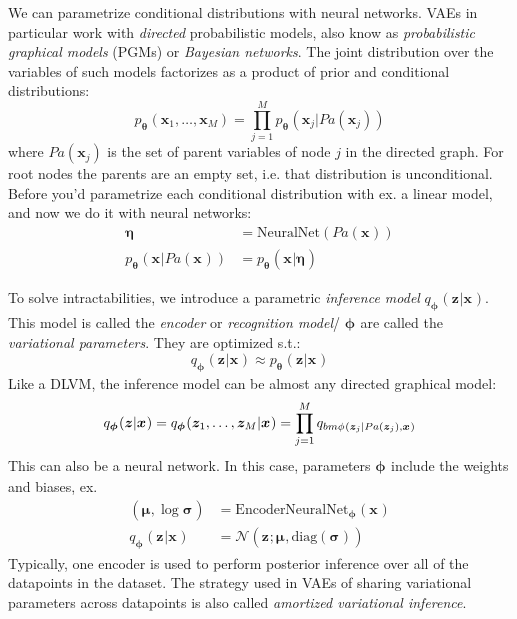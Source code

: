 We can parametrize conditional distributions with neural networks.
VAEs in particular work with \textit{directed} probabilistic models,
also know as \textit{probabilistic graphical models} (PGMs)
or \textit{Bayesian networks}.
The joint distribution over the variables of such models
factorizes as a product of prior and conditional distributions:
\begin{equation}
p_{ \bm{\theta}_{} } (\bm{x}_{1}, \dots, \bm{x}_{M}) =
\prod_{j=1}^{M} p_{ \bm{\theta}_{} } (\bm{x}_{j}| Pa (\bm{x}_{j})) 
\end{equation}
where $ P a (\bm{x}_{j})  $ is the set of parent variables of node $ j  $ in
the directed graph. For root nodes the parents are an empty set,
i.e. that distribution is unconditional.
Before you'd parametrize each conditional distribution with
ex. a linear model, and now we do it with neural networks:
\begin{align}
		\bm{\eta}_{} &= \text{NeuralNet} (P a (\bm{x}_{}))\\
		p_{ \bm{\theta}_{} } (\bm{x}_{}|Pa (\bm{x}_{})) &= p_{ \bm{\theta}_{} } (\bm{x}_{}|\bm{\eta}_{})
\end{align}

To solve intractabilities, we introduce
a parametric \textit{inference model} $ q_{ \bm{\phi}_{}} (\bm{z}_{}|\bm{x}_{})  $.
This model is called the \textit{encoder} or \textit{recognition model}/
$ \bm{\phi}_{}  $ are called the \textit{variational parameters}.
They are optimized s.t.:
\begin{equation}
		 q_{ \bm{\phi}_{}} (\bm{z}_{}|\bm{x}_{})  \approx
p_{ \bm{\theta}_{} } (\bm{z}_{}|\bm{x}_{})
\end{equation}
Like a DLVM, the inference model can be almost any directed graphical model:
\begin{equation}
		q_{ \bm{\phi}_{}} (\bm{z}_{}|\bm{x}_{}) = 
		q_{ \bm{\phi}_{}} (\bm{z}_{1}, \dots, \bm{z}_{M}|\bm{x}_{}) =
		\prod_{j=1}^{M} q_{ \\bm{\phi}_{} (\bm{z}_{j}| P a (\bm{z}_{j}), \bm{x}_{}) } 
\end{equation}
This can also be a neural network.
In this case, parameters $ \bm{\phi}_{}  $ include the weights and biases, ex.
\begin{align}
		(\bm{\mu}_{}, \log \bm{\sigma}_{}) &= \text{EncoderNeuralNet}_{ \bm{\phi}_{} } (\bm{x}_{})\\
		q_{ \bm{\phi}_{} } (\bm{z}_{}|\bm{x}_{}) &=
		\mathcal{N} (\bm{z}_{}; \bm{\mu}_{}, \text{diag} (\bm{\sigma}_{}))
\end{align}
Typically, one encoder is used to perform posterior inference
over all of the datapoints in the dataset.
The strategy used in VAEs of sharing variational parameters across datapoints is also called
\textit{amortized variational inference}.


